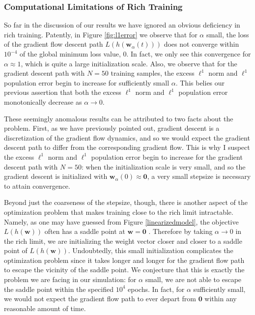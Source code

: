 \documentclass{article}
\begin{document}
\subsubsection{Computational Limitations of Rich Training}
So far in the discussion of our results we have ignored an obvious deficiency in rich training. Patently, in Figure \ref{fig:l1error} we observe that for $\alpha$ small, the loss of the gradient flow descent path $L(h(\boldsymbol{w}_{\alpha}(t)))$ does not converge within $10^{-4}$ of the global minimum loss value, $0$. In fact, we only see this convergence for $\alpha \approx 1$, which is quite a large initialization scale. Also, we observe that for the gradient descent path with $N=50$ training samples, the excess $\ell^1$ norm and $\ell^1$ population error begin to increase for sufficiently small $\alpha$. This belies our previous assertion that both the excess $\ell^1$ norm and $\ell^1$ population error monotonically decrease as $\alpha \rightarrow 0$.

These seemingly anomalous results can be attributed to two facts about the problem. First, as we have previously pointed out, gradient descent is a discretization of the gradient flow dynamics, and so we would expect the gradient descent path to differ from the corresponding gradient flow. This is why I suspect the excess $\ell^1$ norm and $\ell^1$ population error begin to increase for the gradient descent path with $N=50$: when the initialization scale is very small, and so the gradient descent is initialized with $\boldsymbol{w}_{\alpha}(0) \approx \boldsymbol{0}$, a very small stepsize is necessary to attain convergence. 

Beyond just the coarseness of the stepsize, though, there is another aspect of the optimization problem that makes training close to the rich limit intractable. Namely, as one may have guessed from Figure \ref{linearizedmodel}, the objective $L(h(\boldsymbol{w}))$ often has a saddle point at $\boldsymbol{w} = \boldsymbol{0}$ \cite{woodworth2020kernel}. Therefore by taking $\alpha \rightarrow 0$ in the rich limit, we are initializing the weight vector closer and closer to a saddle point of $L(h(\boldsymbol{w}))$. Undoubtedly, this small initialization complicates the optimization problem since it takes longer and longer for the gradient flow path to escape the vicinity of the saddle point. We conjecture that this is exactly the problem we are facing in our simulation: for $\alpha$ small, we are not able to escape the saddle point within the specified $10^4$ epochs. In fact, for $\alpha$ sufficiently small, we would not expect the gradient flow path to ever depart from $\boldsymbol{0}$ within any reasonable amount of time. 
\end{document}
